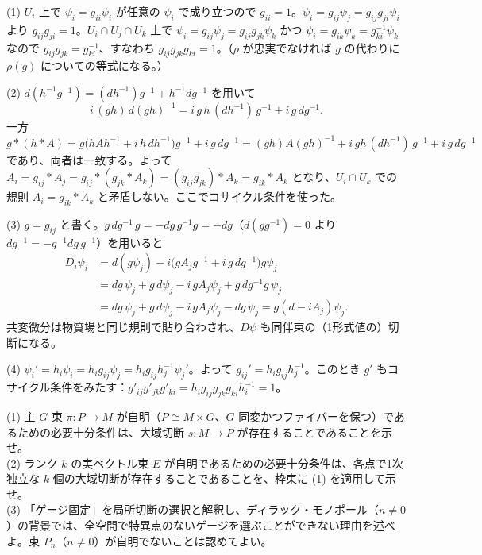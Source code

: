 \begin{solution}
(1) $U_i$ 上で $\psi_i=g_{ii}\psi_i$ が任意の $\psi_i$ で成り立つので $g_{ii}=1$。$\psi_i=g_{ij}\psi_j=g_{ij}g_{ji}\psi_i$ より $g_{ij}g_{ji}=1$。$U_i\cap U_j\cap U_k$ 上で $\psi_i=g_{ij}\psi_j=g_{ij}g_{jk}\psi_k$ かつ $\psi_i=g_{ik}\psi_k=g_{ki}^{-1}\psi_k$ なので $g_{ij}g_{jk}=g_{ki}^{-1}$、すなわち $g_{ij}g_{jk}g_{ki}=1$。（$\rho$ が忠実でなければ $g$ の代わりに $\rho(g)$ についての等式になる。）

(2) $d(h^{-1}g^{-1})=(dh^{-1})g^{-1}+h^{-1}dg^{-1}$ を用いて
\[
i\,(gh)\,d(gh)^{-1}=i\,g\,h\,(dh^{-1})\,g^{-1}+i\,g\,dg^{-1}.
\]
一方
\[
g\ast(h\ast A)=g\bigl(hAh^{-1}+i\,h\,dh^{-1}\bigr)g^{-1}+i\,g\,dg^{-1}=(gh)A(gh)^{-1}+i\,gh\,(dh^{-1})\,g^{-1}+i\,g\,dg^{-1}
\]
であり、両者は一致する。よって $A_i=g_{ij}\ast A_j=g_{ij}\ast(g_{jk}\ast A_k)=(g_{ij}g_{jk})\ast A_k=g_{ik}\ast A_k$ となり、$U_i\cap U_k$ での規則 $A_i=g_{ik}\ast A_k$ と矛盾しない。ここでコサイクル条件を使った。

(3) $g=g_{ij}$ と書く。$g\,dg^{-1}\,g=-dg\,g^{-1}g=-dg$（$d(gg^{-1})=0$ より $dg^{-1}=-g^{-1}dg\,g^{-1}$）を用いると
\begin{align*}
D_i\psi_i&=d(g\psi_j)-i\bigl(gA_jg^{-1}+i\,g\,dg^{-1}\bigr)g\psi_j\\
&=dg\,\psi_j+g\,d\psi_j-i\,gA_j\psi_j+g\,dg^{-1}g\,\psi_j\\
&=dg\,\psi_j+g\,d\psi_j-i\,gA_j\psi_j-dg\,\psi_j=g(d-iA_j)\psi_j .
\end{align*}
共変微分は物質場と同じ規則で貼り合わされ、$D\psi$ も同伴束の（1形式値の）切断になる。

(4) $\psi_i'=h_i\psi_i=h_ig_{ij}\psi_j=h_ig_{ij}h_j^{-1}\psi_j'$。よって $g_{ij}'=h_ig_{ij}h_j^{-1}$。このとき $g'$ もコサイクル条件をみたす：$g'_{ij}g'_{jk}g'_{ki}=h_ig_{ij}g_{jk}g_{ki}h_i^{-1}=1$。
\end{solution}

\begin{problem}[難易度 A]\label{ch07-prob-trivsec}
(1) 主 $G$ 束 $\pi\colon P\to M$ が自明（$P\cong M\times G$、$G$ 同変かつファイバーを保つ）であるための必要十分条件は、大域切断 $s\colon M\to P$ が存在することであることを示せ。\\
(2) ランク $k$ の実ベクトル束 $E$ が自明であるための必要十分条件は、各点で1次独立な $k$ 個の大域切断が存在することであることを、枠束に (1) を適用して示せ。\\
(3) 「ゲージ固定」を局所切断の選択と解釈し、ディラック・モノポール（$n\neq0$）の背景では、全空間で特異点のないゲージを選ぶことができない理由を述べよ。束 $P_n$（$n\neq0$）が自明でないことは認めてよい。
\end{problem}

